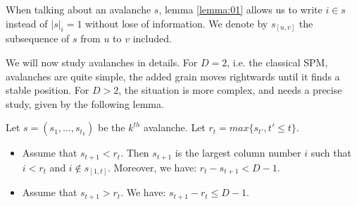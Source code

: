 \documentclass[11pt,a4paper]{llncs}
\begin{document}
When talking about an avalanche $s$, lemma \ref{lemma:01} allows us to write $i \in s$ instead of $|s|_i=1$ without lose of information. We denote by  $s_{[u, v]}$  the  subsequence of $s$ from  $u$ to $v$ included.

We will now study avalanches in details. For $D = 2$, i.e.  the classical SPM, avalanches are quite simple, the added grain moves rightwards until it finds a stable position. For $D > 2$, the situation is more complex, and needs a precise study, given by the following lemma.  


\begin{lemma}\label{lemma:localdensity}
Let $s=(s_1,\dots,s_{t_k})$ be the $k^{th}$ avalanche. Let $r_t = max \{s_{t'}, t' \leq t \}$.
\begin{itemize}
\item Assume that $s_{t+1} < r_t$.  Then $s_{t+1}$  is the largest column number $i$ such that $i < r_t$ and $i \notin s_{[1,t]}$. Moreover,  we have: $r_t - s_{t+1} < D-1$.
\item Assume that $s_{t+1} > r_t$. We have:  $s_{t+1} -r_t  \leq  D-1$.
\end{itemize}

\end{lemma}
\end{document}
